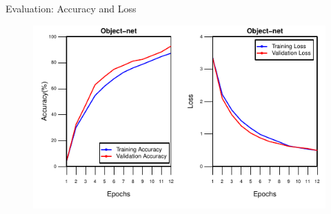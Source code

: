 \documentclass[9pt]{beamer}
\begin{document}
\begin{frame}[fragile]{Evaluation: Accuracy and Loss }
	\begin{figure}
		\centering
		\includegraphics[width=\textwidth]{images/one_to_one.pdf}

	\end{figure}
\end{frame}

\end{document}
